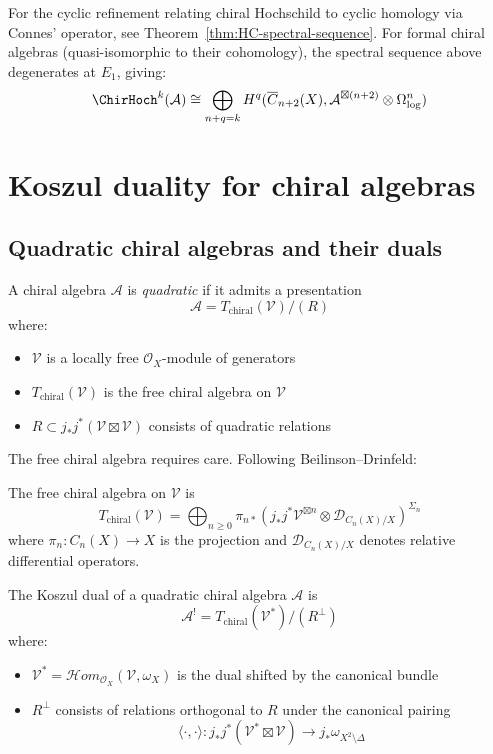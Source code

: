 For the cyclic refinement relating chiral Hochschild to cyclic homology via Connes' operator, see Theorem~\ref{thm:HC-spectral-sequence}. For formal chiral algebras (quasi-isomorphic to their cohomology), the spectral sequence above degenerates at $E_1$, giving:
\[
\ChirHoch^k(\mathcal{A}) \cong \bigoplus_{n+q=k} H^q(\overline{C}_{n+2}(X), \mathcal{A}^{\boxtimes (n+2)} \otimes \Omega^n_{\log})
\]

\section{Koszul duality for chiral algebras}

\subsection{Quadratic chiral algebras and their duals}

\begin{definition}
A chiral algebra $\mathcal{A}$ is \emph{quadratic} if it admits a presentation
\[
\mathcal{A} = T_{\text{chiral}}(\mathcal{V})/(R)
\]
where:
\begin{itemize}
\item $\mathcal{V}$ is a locally free $\mathcal{O}_X$-module of generators
\item $T_{\text{chiral}}(\mathcal{V})$ is the free chiral algebra on $\mathcal{V}$
\item $R \subset j_*j^*(\mathcal{V} \boxtimes \mathcal{V})$ consists of quadratic relations
\end{itemize}
\end{definition}

The free chiral algebra requires care. Following Beilinson--Drinfeld:

\begin{definition}
The free chiral algebra on $\mathcal{V}$ is
\[
T_{\text{chiral}}(\mathcal{V}) = \bigoplus_{n \geq 0} \pi_{n*}\left(j_*j^*\mathcal{V}^{\boxtimes n} \otimes \mathcal{D}_{C_n(X)/X}\right)^{\Sigma_n}
\]
where $\pi_n: C_n(X) \to X$ is the projection and $\mathcal{D}_{C_n(X)/X}$ denotes relative differential operators.
\end{definition}

\begin{definition}
The Koszul dual of a quadratic chiral algebra $\mathcal{A}$ is
\[
\mathcal{A}^! = T_{\text{chiral}}(\mathcal{V}^*)/(R^{\perp})
\]
where:
\begin{itemize}
\item $\mathcal{V}^* = \mathcal{H}om_{\mathcal{O}_X}(\mathcal{V}, \omega_X)$ is the dual shifted by the canonical bundle
\item $R^{\perp}$ consists of relations orthogonal to $R$ under the canonical pairing
\[
\langle \cdot, \cdot \rangle: j_*j^*(\mathcal{V}^* \boxtimes \mathcal{V}) \to j_*\omega_{X^2 \setminus \Delta}
\]
\end{itemize}
\end{definition}

